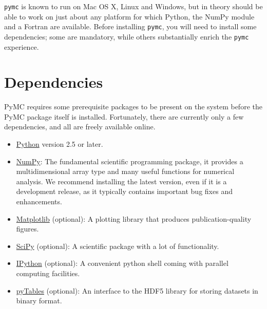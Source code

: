 


\texttt{pymc} is known to run on Mac OS X, Linux and Windows, but in theory should be 
able to work on just about any platform for which Python, the NumPy module and a Fortran 
are available. Before installing \texttt{pymc}, you will need to install some dependencies; some are mandatory, while others substantially enrich the \texttt{pymc} experience.



\hypertarget{dependencies}{}
\section*{Dependencies}

PyMC requires some prerequisite packages to be present on the system before the 
PyMC package itself is installed. Fortunately, there are currently only a few 
dependencies, and all are freely available online.
\begin{itemize}
\item {} 
\href{http://www.python.org/.}{Python} version 2.5 or later.

\item {} 
\href{http://www.scipy.org/NumPy}{NumPy}: The fundamental scientific programming package, it provides a 
multidimensional array type and many useful functions for numerical analysis. 
We recommend installing the latest version, even if it is a development release,
as it typically contains important bug fixes and enhancements.

\item {} 
\href{http://matplotlib.sourceforge.net/}{Matplotlib} (optional): A plotting library that produces publication-quality figures.

\item {} 
\href{http://www.scipy.org/}{SciPy} (optional): A scientific package with a lot of functionality.

\item {} 
\href{http://ipython.scipy.org/}{IPython} (optional): A convenient python shell coming with parallel 
computing facilities.

\item {} 
\href{http://www.pytables.org/moin}{pyTables} (optional): An interface to the HDF5 library for storing datasets
in binary format.

\end{itemize}

